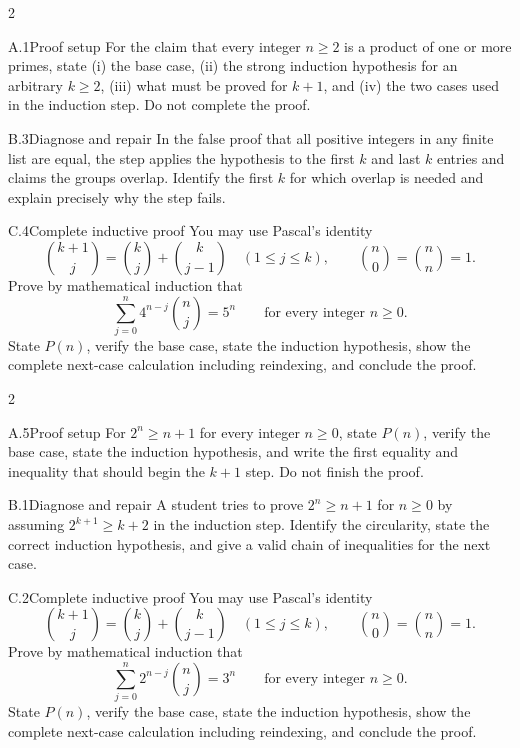 \documentclass[9pt]{extarticle}
\begin{document}
\CoreWorkArea
\FormBreak
{}
\begin{multicols}{2}
\begin{CompactCoreProblem}{A.1}{Proof setup}
For the claim that every integer $n\ge2$ is a product of one or more primes, state (i) the base case, (ii) the strong induction hypothesis for an arbitrary $k\ge2$, (iii) what must be proved for $k+1$, and (iv) the two cases used in the induction step. Do not complete the proof.
\end{CompactCoreProblem}
\begin{CompactCoreProblem}{B.3}{Diagnose and repair}
In the false proof that all positive integers in any finite list are equal, the step applies the hypothesis to the first $k$ and last $k$ entries and claims the groups overlap. Identify the first $k$ for which overlap is needed and explain precisely why the step fails.
\end{CompactCoreProblem}
\end{multicols}
\begin{CompactCoreProblem}{C.4}{Complete inductive proof}
You may use Pascal's identity
\[
\binom{k+1}{j}=\binom{k}{j}+\binom{k}{j-1}
\quad(1\le j\le k),\qquad
\binom{n}{0}=\binom{n}{n}=1.
\]
Prove by mathematical induction that
\[
\sum_{j=0}^{n} 4^{n-j}\binom{n}{j}=5^n\qquad\text{for every integer }n\ge0.
\]
State $P(n)$, verify the base case, state the induction hypothesis, show the complete next-case calculation including reindexing, and conclude the proof.
\end{CompactCoreProblem}
\CoreWorkArea
\FormBreak
{}
\begin{multicols}{2}
\begin{CompactCoreProblem}{A.5}{Proof setup}
For $2^n\ge n+1$ for every integer $n\ge0$, state $P(n)$, verify the base case, state the induction hypothesis, and write the first equality and inequality that should begin the $k+1$ step. Do not finish the proof.
\end{CompactCoreProblem}
\begin{CompactCoreProblem}{B.1}{Diagnose and repair}
A student tries to prove $2^n\ge n+1$ for $n\ge0$ by assuming $2^{k+1}\ge k+2$ in the induction step. Identify the circularity, state the correct induction hypothesis, and give a valid chain of inequalities for the next case.
\end{CompactCoreProblem}
\end{multicols}
\begin{CompactCoreProblem}{C.2}{Complete inductive proof}
You may use Pascal's identity
\[
\binom{k+1}{j}=\binom{k}{j}+\binom{k}{j-1}
\quad(1\le j\le k),\qquad
\binom{n}{0}=\binom{n}{n}=1.
\]
Prove by mathematical induction that
\[
\sum_{j=0}^{n} 2^{n-j}\binom{n}{j}=3^n\qquad\text{for every integer }n\ge0.
\]
State $P(n)$, verify the base case, state the induction hypothesis, show the complete next-case calculation including reindexing, and conclude the proof.
\end{CompactCoreProblem}
\end{document}
